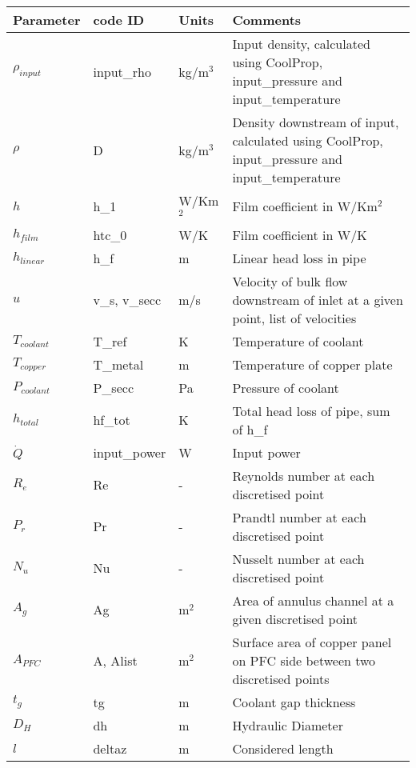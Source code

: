 \documentclass{article}
\begin{document}
\begin{table}[H]
	\centering
	\begin{tabular}{|p{2cm}|p{3cm}|p{1cm}|p{7cm}|}
		\hline
		\cellcolor{black!10} Parameter & \cellcolor{black!10} code ID & \cellcolor{black!10} Units & \cellcolor{black!10} Comments \\
		\hline
		$\rho_{input}$ & input\_rho & kg/m$^{3}$ & Input density, calculated using CoolProp, input\_pressure and input\_temperature \\
		\hline
		$\rho$ & D & kg/m$^{3}$ & Density downstream of input, calculated using CoolProp, input\_pressure and input\_temperature \\
		\hline
		$h$ & h\_1 & W/Km$^{2}$ & Film coefficient in W/Km$^{2}$\\
		\hline
		$h_{film}$ & htc\_0 & W/K & Film coefficient in W/K\\
		\hline
		$h_{linear}$ & h\_f & m & Linear head loss in pipe \\
		\hline
		$u$ & v\_s, v\_secc & m/s & Velocity of bulk flow downstream of inlet at a given point, list of velocities \\
		\hline
		$T_{coolant}$ & T\_ref & K & Temperature of coolant \\
		\hline
		$T_{copper}$ & T\_metal & m & Temperature of copper plate \\
		\hline
		$P_{coolant}$ & P\_secc & Pa & Pressure of coolant \\
		\hline
		$h_{total}$ & hf\_tot & K & Total head loss of pipe, sum of h\_f \\
		\hline
		$\dot{Q}$ & input\_power & W & Input power\\
		\hline
		$R_{e}$ & Re & - & Reynolds number at each discretised point \\
		\hline
		$P_{r}$ & Pr & - & Prandtl number at each discretised point \\
		\hline
		$N_{u}$ & Nu & - & Nusselt number at each discretised point \\
		\hline
		$A_{g}$ & Ag & m$^{2}$ & Area of annulus channel at a given discretised point \\
		\hline
		$A_{PFC}$ & A, Alist & m$^{2}$ & Surface area of copper panel on PFC side between two discretised points \\
		\hline
		$t_{g}$ & tg & m & Coolant gap thickness \\
		\hline
		$D_{H}$ & dh & m & Hydraulic Diameter\\
		\hline
		$l$ & deltaz & m & Considered length \\

\end{tabular}
\end{table}
\end{document}
